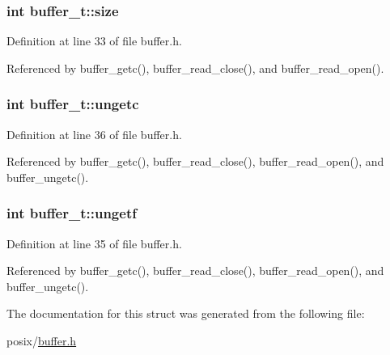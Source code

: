 \subsubsection[{\texorpdfstring{size}{size}}]{\setlength{\rightskip}{0pt plus 5cm}int buffer\+\_\+t\+::size}\hypertarget{structbuffer__t_a34e81d898c6accf4f06ed9c1133d6361}{}\label{structbuffer__t_a34e81d898c6accf4f06ed9c1133d6361}


Definition at line 33 of file buffer.\+h.



Referenced by buffer\+\_\+getc(), buffer\+\_\+read\+\_\+close(), and buffer\+\_\+read\+\_\+open().

\subsubsection[{\texorpdfstring{ungetc}{ungetc}}]{\setlength{\rightskip}{0pt plus 5cm}int buffer\+\_\+t\+::ungetc}\hypertarget{structbuffer__t_aa1fbbf42ce5d6278b21a93647bef3ff1}{}\label{structbuffer__t_aa1fbbf42ce5d6278b21a93647bef3ff1}


Definition at line 36 of file buffer.\+h.



Referenced by buffer\+\_\+getc(), buffer\+\_\+read\+\_\+close(), buffer\+\_\+read\+\_\+open(), and buffer\+\_\+ungetc().

\subsubsection[{\texorpdfstring{ungetf}{ungetf}}]{\setlength{\rightskip}{0pt plus 5cm}int buffer\+\_\+t\+::ungetf}\hypertarget{structbuffer__t_a67c2edddeca1858c670ff57e049a9e0e}{}\label{structbuffer__t_a67c2edddeca1858c670ff57e049a9e0e}


Definition at line 35 of file buffer.\+h.



Referenced by buffer\+\_\+getc(), buffer\+\_\+read\+\_\+close(), buffer\+\_\+read\+\_\+open(), and buffer\+\_\+ungetc().



The documentation for this struct was generated from the following file\+:\begin{DoxyCompactItemize}
\item 
posix/\hyperlink{buffer_8h}{buffer.\+h}\end{DoxyCompactItemize}
